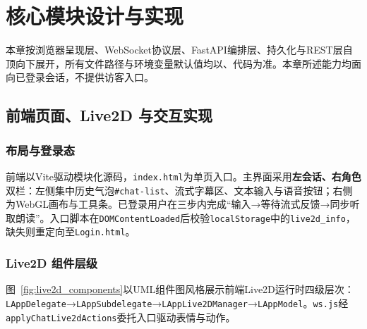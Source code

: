 \documentclass{base}
\begin{document}
\chapter{核心模块设计与实现}

本章按浏览器呈现层、WebSocket协议层、FastAPI编排层、持久化与REST层自顶向下展开，所有文件路径与环境变量默认值均以、代码为准。本章所述能力均面向已登录会话，不提供访客入口。

\section{前端页面、Live2D 与交互实现}

\subsection{布局与登录态}

前端以Vite驱动模块化源码，\texttt{index.html}为单页入口。主界面采用\textbf{左会话、右角色}双栏：左侧集中历史气泡\texttt{\#chat-list}、流式字幕区、文本输入与语音按钮；右侧为WebGL画布与工具条。已登录用户在三步内完成``输入→等待流式反馈→同步听取朗读''。入口脚本在\texttt{DOMContentLoaded}后校验\texttt{localStorage}中的\texttt{live2d\_info}，缺失则重定向至\texttt{Login.html}。

\subsection{Live2D 组件层级}

图~\ref{fig:live2d_components}以UML组件图风格展示前端Live2D运行时四级层次：\texttt{LAppDelegate}→\texttt{LAppSubdelegate}→\texttt{LAppLive2DManager}→\texttt{LAppModel}。\texttt{ws.js}经\texttt{applyChatLive2dActions}委托入口驱动表情与动作。
\end{document}
